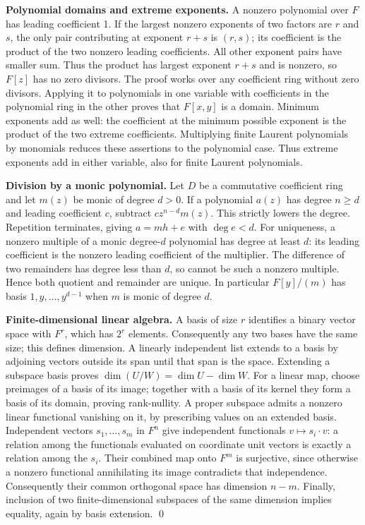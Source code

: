 \documentclass{article}
\begin{document}
\textbf{Polynomial domains and extreme exponents.} A nonzero polynomial over
\(F\) has leading coefficient 1. If the largest nonzero exponents of two
factors are \(r\) and \(s\), the only pair contributing at exponent \(r + s\) is
\((r,s)\); its coefficient is the product of the two nonzero leading
coefficients. All other exponent pairs have smaller sum. Thus the product
has largest exponent \(r + s\) and is nonzero, so \(F[z]\) has no zero divisors. The proof
works over any coefficient ring without zero divisors. Applying it to
polynomials in one variable with coefficients in the polynomial ring in
the other proves that \(F[x,y]\) is a domain. Minimum exponents add as well:
the coefficient at the minimum possible exponent is the product of the
two extreme coefficients. Multiplying finite Laurent polynomials by
monomials reduces these assertions to the polynomial case. Thus extreme
exponents add in either variable, also for finite Laurent polynomials.

\textbf{Division by a monic polynomial.} Let \(D\) be a commutative coefficient ring and let
\(m(z)\) be monic of degree \(d > 0\). If a polynomial \(a(z)\) has degree
\(n \ge d\) and leading coefficient \(c\), subtract \(c z^{n-d} m(z)\).
This strictly lowers the degree. Repetition terminates, giving
\(a = mh + e\) with \(\deg e < d\). For uniqueness, a nonzero multiple of a monic
degree-\(d\) polynomial has degree at least \(d\): its leading coefficient
is the nonzero leading coefficient of the multiplier. The difference of
two remainders has degree less than \(d\), so cannot be such a nonzero
multiple. Hence both quotient and remainder are unique. In particular
\(F[y]/(m)\) has basis \(1, y, \dots, y^{d-1}\) when \(m\) is monic of degree \(d\).

\textbf{Finite-dimensional linear algebra.} A basis of size \(r\) identifies a binary
vector space with \(F^r\), which has \(2^r\) elements. Consequently any two
bases have the same size; this defines dimension. A linearly independent list extends
to a basis by adjoining vectors outside its span until that span is the
space. Extending a subspace basis proves
\(\dim(U/W) = \dim U - \dim W\). For a linear map, choose preimages of a basis of
its image; together with a basis of its kernel they form a basis of its
domain, proving rank-nullity. A proper subspace admits a nonzero linear
functional vanishing on it, by prescribing values on an extended basis.
Independent vectors \(s_1, \dots, s_m\) in \(F^n\) give independent functionals
\(v \mapsto s_i \cdot v\): a relation among the functionals evaluated on
coordinate unit vectors is exactly a relation among the \(s_i\).
Their combined map onto \(F^m\) is surjective, since otherwise a nonzero
functional annihilating its image contradicts that independence.
Consequently their common orthogonal space has dimension \(n - m\).
Finally, inclusion of two finite-dimensional subspaces of the same
dimension implies equality, again by basis extension. \qed
\end{document}
